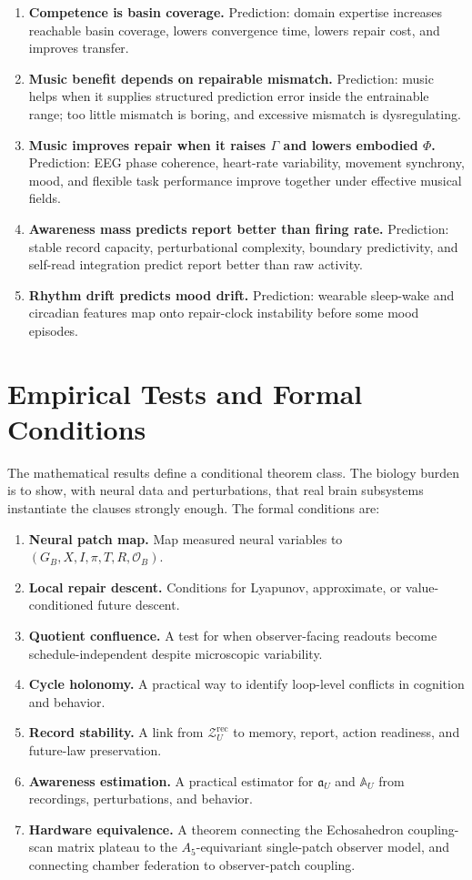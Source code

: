 \documentclass[11pt]{article}
\theoremstyle{remark}
\theoremstyle{plain}
\newcommand{\rec}{\mathrm{rec}}
\begin{document}
\begin{enumerate}
\item \textbf{Competence is basin coverage.} Prediction: domain expertise increases reachable basin coverage, lowers convergence time, lowers repair cost, and improves transfer.
\item \textbf{Music benefit depends on repairable mismatch.} Prediction: music helps when it supplies structured prediction error inside the entrainable range; too little mismatch is boring, and excessive mismatch is dysregulating.
\item \textbf{Music improves repair when it raises \(\Gamma\) and lowers embodied \(\Phi\).} Prediction: EEG phase coherence, heart-rate variability, movement synchrony, mood, and flexible task performance improve together under effective musical fields.
\item \textbf{Awareness mass predicts report better than firing rate.} Prediction: stable record capacity, perturbational complexity, boundary predictivity, and self-read integration predict report better than raw activity.
\item \textbf{Rhythm drift predicts mood drift.} Prediction: wearable sleep-wake and circadian features map onto repair-clock instability before some mood episodes.
\end{enumerate}

\section{Empirical Tests and Formal Conditions}

The mathematical results define a conditional theorem class. The biology
burden is to show, with neural data and perturbations, that real brain
subsystems instantiate the clauses strongly enough. The formal conditions are:

\begin{enumerate}
\item \textbf{Neural patch map.} Map measured neural variables to \((G_B,X,I,\pi,T,R,\mathcal O_B)\).
\item \textbf{Local repair descent.} Conditions for Lyapunov, approximate, or value-conditioned future descent.
\item \textbf{Quotient confluence.} A test for when observer-facing readouts become schedule-independent despite microscopic variability.
\item \textbf{Cycle holonomy.} A practical way to identify loop-level conflicts in cognition and behavior.
\item \textbf{Record stability.} A link from \(\mathcal Z_U^{\rec}\) to memory, report, action readiness, and future-law preservation.
\item \textbf{Awareness estimation.} A practical estimator for \(\mathfrak a_U\) and \(\mathbb A_U\) from recordings, perturbations, and behavior.
\item \textbf{Hardware equivalence.} A theorem connecting the Echosahedron coupling-scan matrix plateau to the \(A_5\)-equivariant single-patch observer model, and connecting chamber federation to observer-patch coupling.
\end{enumerate}
\end{document}
